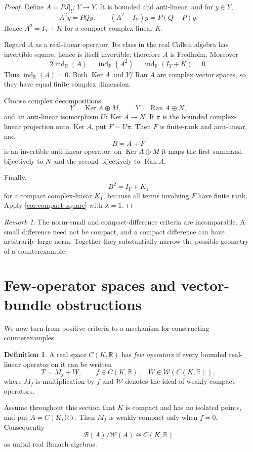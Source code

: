 \documentclass[11pt]{article}
\theoremstyle{definition}
\newtheorem{definition}[theorem]{Definition}
\theoremstyle{remark}
\newtheorem{remark}[theorem]{Remark}
\newcommand{\R}{\mathbb R}
\newcommand{\cW}{\mathcal W}
\newcommand{\cB}{\mathcal B}
\newcommand{\Ran}{\operatorname{Ran}}
\newcommand{\Ker}{\operatorname{Ker}}
\newcommand{\ind}{\operatorname{ind}}
\begin{document}
\begin{proof}
Define $A=PJ|_Y:Y\to Y$. It is bounded and anti-linear, and for $y\in Y$,
\[
 A^2y=PQy,
 \qquad
 (A^2-I_Y)y=P(Q-P)y.
\]
Hence $A^2=I_Y+K$ for a compact complex-linear $K$.

Regard $A$ as a real-linear operator. Its class in the real Calkin algebra has invertible square, hence is itself invertible; therefore $A$ is Fredholm. Moreover
\[
 2\ind_{\R}(A)=\ind_{\R}(A^2)=\ind_{\R}(I_Y+K)=0.
\]
Thus $\ind_{\R}(A)=0$. Both $\Ker A$ and $Y/\Ran A$ are complex vector spaces, so they have equal finite complex dimension.

Choose complex decompositions
\[
 Y=\Ker A\oplus M,
 \qquad
 Y=\Ran A\oplus N,
\]
and an anti-linear isomorphism $U:\Ker A\to N$. If $\pi$ is the bounded complex-linear projection onto $\Ker A$, put $F=U\pi$. Then $F$ is finite-rank and anti-linear, and
\[
 B=A+F
\]
is an invertible anti-linear operator: on $\Ker A\oplus M$ it maps the first summand bijectively to $N$ and the second bijectively to $\Ran A$.

Finally,
\[
 B^2=I_Y+K_1
\]
for a compact complex-linear $K_1$, because all terms involving $F$ have finite rank. Apply \cref{cor:compact-square} with $\lambda=1$.
\end{proof}

\begin{remark}
The norm-small and compact-difference criteria are incomparable. A small difference need not be compact, and a compact difference can have arbitrarily large norm. Together they substantially narrow the possible geometry of a counterexample.
\end{remark}

\section{Few-operator spaces and vector-bundle obstructions}

We now turn from positive criteria to a mechanism for constructing counterexamples.

\begin{definition}
A real space $C(K,\R)$ has \emph{few operators} if every bounded real-linear operator on it can be written
\[
       T=M_f+W,
       \qquad f\in C(K,\R),\quad W\in\cW(C(K,\R)),
\]
where $M_f$ is multiplication by $f$ and $\cW$ denotes the ideal of weakly compact operators.
\end{definition}

Assume throughout this section that $K$ is compact and has no isolated points, and put $A=C(K,\R)$. Then $M_f$ is weakly compact only when $f=0$. Consequently
\[
       \cB(A)/\cW(A)\cong C(K,\R)
\]
as unital real Banach algebras.
\end{document}
